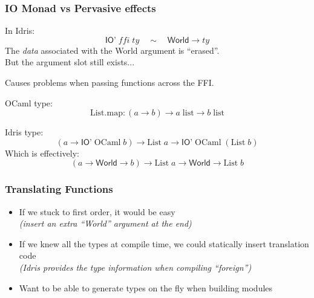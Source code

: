 \documentclass[aspectratio=169]{beamer}
\begin{document}
\begin{frame}[t]
  \frametitle{IO Monad vs Pervasive effects}

  In Idris:
  \begin{displaymath}
    \textsf{IO'}\;\mathit{ffi}\;\mathit{ty} \quad \sim \quad \textsf{World} \to \mathit{ty}
  \end{displaymath}
  The \textit{data} associated with the \textsf{World} argument is ``erased''. \\
  But the argument slot still exists...

  \bigskip

  Causes problems when passing functions across the FFI.

  \pause
  \bigskip

  OCaml type:
  \begin{displaymath}
    \mathrm{List.map} : (a \to b) \to a\;\mathrm{list} \to b\;\mathrm{list}
  \end{displaymath}

  Idris type:
  \begin{displaymath}
    (a \to \textsf{IO'}\;\mathrm{OCaml}\;b) \to \mathrm{List}\;a \to \textsf{IO'}\;\mathrm{OCaml}\;(\mathrm{List}\;b)
  \end{displaymath}
  \pause
  Which is effectively:
  \begin{displaymath}
    (a \to \textsf{World} \to b) \to \mathrm{List}\;a \to \textsf{World} \to \mathrm{List}\;b
  \end{displaymath}

\end{frame}

\begin{frame}[t]
  \frametitle{Translating Functions}

  \begin{itemize}
  \item If we stuck to first order, it would be easy \\
    \qquad \textit{(insert an extra ``\textsf{World}'' argument at the end)} \\
    \vspace{1em}
  \item If we knew all the types at compile time, we could statically insert translation code\\
    \qquad \textit{(Idris provides the type information when compiling ``foreign'')} \\
    \vspace{1em}
  \item Want to be able to generate types on the fly when building modules
  \end{itemize}

\end{frame}
\end{document}
